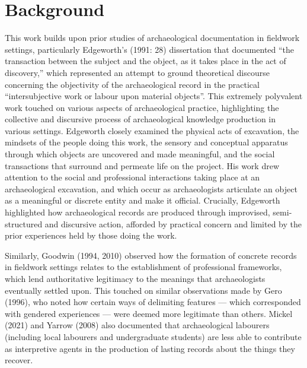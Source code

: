 \documentclass[
]{article}
\begin{document}
\section{Background}\label{background}

This work builds upon prior studies of archaeological documentation in
fieldwork settings, particularly Edgeworth's (1991: 28) dissertation
that documented ``the transaction between the subject and the object, as
it takes place in the act of discovery,'' which represented an attempt
to ground theoretical discourse concerning the objectivity of the
archaeological record in the practical ``intersubjective work or labour
upon material objects''. This extremely polyvalent work touched on
various aspects of archaeological practice, highlighting the collective
and discursive process of archaeological knowledge production in various
settings. Edgeworth closely examined the physical acts of excavation,
the mindsets of the people doing this work, the sensory and conceptual
apparatus through which objects are uncovered and made meaningful, and
the social transactions that surround and permeate life on the project.
His work drew attention to the social and professional interactions
taking place at an archaeological excavation, and which occur as
archaeologists articulate an object as a meaningful or discrete entity
and make it official. Crucially, Edgeworth highlighted how
archaeological records are produced through improvised, semi-structured
and discursive action, afforded by practical concern and limited by the
prior experiences held by those doing the work.

Similarly, Goodwin (1994, 2010) observed how the formation of concrete
records in fieldwork settings relates to the establishment of
professional frameworks, which lend authoritative legitimacy to the
meanings that archaeologists eventually settled upon. This touched on
similar observations made by Gero (1996), who noted how certain ways of
delimiting features --- which corresponded with gendered experiences ---
were deemed more legitimate than others. Mickel (2021) and Yarrow (2008)
also documented that archaeological labourers (including local labourers
and undergraduate students) are less able to contribute as interpretive
agents in the production of lasting records about the things they
recover.
\end{document}

